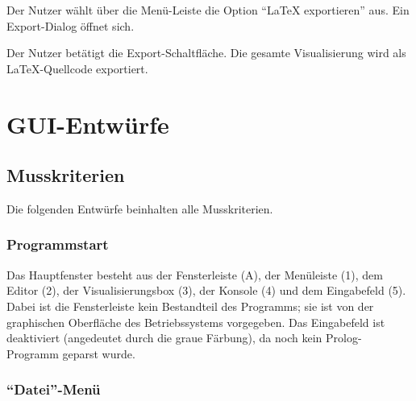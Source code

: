 \documentclass[parskip=full,11pt,twoside]{scrartcl}
\begin{document}
{Der Nutzer wählt über die Menü-Leiste die Option \enquote{LaTeX exportieren} aus.}
{Ein Export-Dialog öffnet sich.}

{Der Nutzer betätigt die Export-Schaltfläche.}
{Die gesamte Visualisierung wird als LaTeX-Quellcode exportiert.}

\appendix

\section{GUI-Entwürfe}

\subsection{Musskriterien}

Die folgenden Entwürfe beinhalten alle Musskriterien.

\subsubsection{Programmstart}

\begin{minipage}{\linewidth}
\end{minipage}

Das Hauptfenster besteht aus der Fensterleiste (A), der Menüleiste (1), dem Editor (2), der Visualisierungsbox (3), der Konsole (4) und dem Eingabefeld (5).
Dabei ist die Fensterleiste kein Bestandteil des Programms; sie ist von der graphischen Oberfläche des Betriebssystems vorgegeben.
Das Eingabefeld ist deaktiviert (angedeutet durch die graue Färbung), da noch kein Prolog-Programm geparst wurde.

\subsubsection{\enquote{Datei}-Menü}

\begin{minipage}{\linewidth}
\end{minipage}
\end{document}
